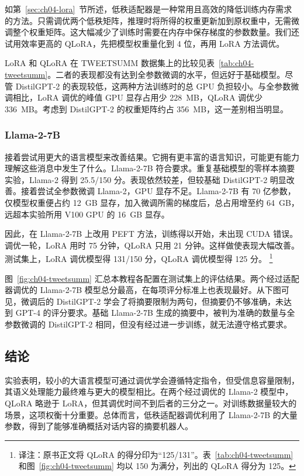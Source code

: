 如第~\ref{sec:ch04-lora}~节所述，低秩适配器是一种常用且高效的降低训练内存需求的方法。只需调优两个低秩矩阵，推理时将所得的权重更新加到原权重中，无需微调整个权重矩阵。这大幅减少了训练时需要在内存中保存梯度的参数数量。我们还试用效率更高的 QLoRA，先把模型权重量化到 4 位，再用 LoRA 方法调优。

LoRA 和 QLoRA 在 TWEETSUMM 数据集上的比较见表~\ref{tab:ch04-tweetsumm}。二者的表现都没有达到全参数微调的水平，但远好于基础模型。尽管 DistilGPT-2 的表现较低，这两种方法训练时的总 GPU 负担较小。与全参数微调相比，LoRA 调优的峰值 GPU 显存占用少 228~MB，QLoRA 调优少 336~MB。考虑到 DistilGPT-2 的权重矩阵约占 356~MB，这一差别相当明显。

\subsubsection{Llama-2-7B}
接着尝试用更大的语言模型来改善结果。它拥有更丰富的语言知识，可能更有能力理解这些消息中发生了什么。Llama-2-7B 符合要求。重复基础模型的零样本摘要实验，Llama-2 得到 25.5/150 分。表现依然较差，但较基础 DistilGPT-2 明显改善。接着尝试全参数微调 Llama-2，GPU 显存不足。Llama-2-7B 有 70 亿参数，仅模型权重便占约 12~GB 显存，加入微调所需的梯度后，总占用增至约 64~GB，远超本实验所用 V100 GPU 的 16~GB 显存。


因此，在 Llama-2-7B 上改用 PEFT 方法，训练得以开始，未出现 CUDA 错误。调优一轮，LoRA 用时 75 分钟，QLoRA 只用 21 分钟。这样做使表现大幅改善。测试集上，LoRA 调优模型得 131/150 分，QLoRA 调优模型得 125 分。%
\footnote{译注：原书正文将 QLoRA 的得分印为“125/131”。表~\ref{tab:ch04-tweetsumm} 和图~\ref{fig:ch04-tweetsumm} 均以 150 为满分，列出的 QLoRA 得分为 125。}

图~\ref{fig:ch04-tweetsumm} 汇总本教程各配置在测试集上的评估结果。两个经过适配器调优的 Llama-2-7B 模型总分最高，在每项评分标准上也表现最好。从下图可见，微调后的 DistilGPT-2 学会了将摘要限制为两句，但摘要仍不够准确，未达到 GPT-4 的评分要求。基础 Llama-2-7B 生成的摘要中，被判为准确的数量与全参数微调的 DistilGPT-2 相同，但没有经过进一步训练，就无法遵守格式要求。

\subsection{结论}
实验表明，较小的大语言模型可通过调优学会遵循特定指令，但受信息容量限制，其语义处理能力最终难与更大的模型相比。在两个经过调优的 Llama-2 模型中，QLoRA 略逊于 LoRA，但其调优时间不到后者的三分之一。对训练数据量较大的场景，这项权衡十分重要。总体而言，低秩适配器调优利用了 Llama-2-7B 的大量参数，得到了能够准确概括对话内容的摘要机器人。
